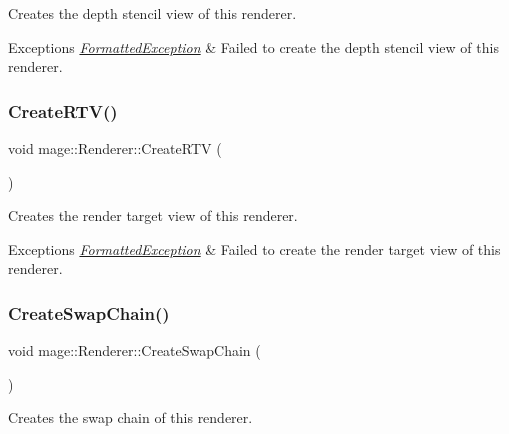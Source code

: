 Creates the depth stencil view of this renderer.


\begin{DoxyExceptions}{Exceptions}
{\em \hyperlink{structmage_1_1_formatted_exception}{Formatted\+Exception}} & Failed to create the depth stencil view of this renderer. \\
\hline
\end{DoxyExceptions}
\hypertarget{classmage_1_1_renderer_a140f8bfcf5c30343791f0187f5caef14}{}\label{classmage_1_1_renderer_a140f8bfcf5c30343791f0187f5caef14} 
\subsubsection{\texorpdfstring{Create\+R\+T\+V()}{CreateRTV()}}
{\footnotesize\ttfamily void mage\+::\+Renderer\+::\+Create\+R\+TV (\begin{DoxyParamCaption}{ }\end{DoxyParamCaption})\hspace{0.3cm}{\ttfamily [private]}}

Creates the render target view of this renderer.


\begin{DoxyExceptions}{Exceptions}
{\em \hyperlink{structmage_1_1_formatted_exception}{Formatted\+Exception}} & Failed to create the render target view of this renderer. \\
\hline
\end{DoxyExceptions}
\hypertarget{classmage_1_1_renderer_a1bd77bf54ea3a7867691785efd183013}{}\label{classmage_1_1_renderer_a1bd77bf54ea3a7867691785efd183013} 
\subsubsection{\texorpdfstring{Create\+Swap\+Chain()}{CreateSwapChain()}}
{\footnotesize\ttfamily void mage\+::\+Renderer\+::\+Create\+Swap\+Chain (\begin{DoxyParamCaption}{ }\end{DoxyParamCaption})\hspace{0.3cm}{\ttfamily [private]}}

Creates the swap chain of this renderer.


